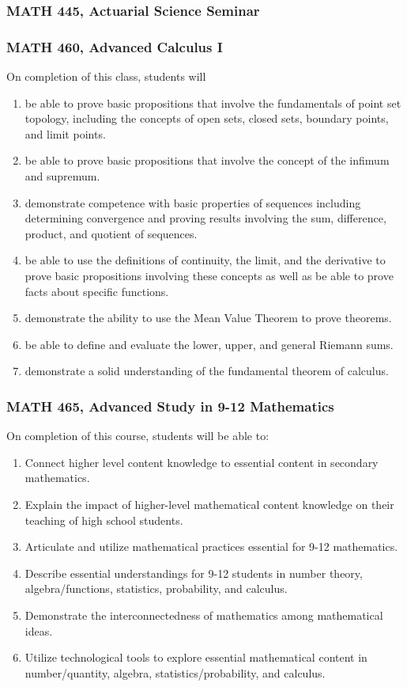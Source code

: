 \documentclass[11pt]{article}
\newenvironment{alphalist}{
\begin{enumerate}[label=(\arabic*),widest=107 ,leftmargin=25pt, itemsep=0pt]}
{\end{enumerate}}
\begin{document}
\subsubsection*{MATH 445, Actuarial Science Seminar}


\subsubsection*{MATH 460, Advanced Calculus I}

On completion of this class, students will
\begin{alphalist}
    \item be able to prove basic propositions that involve the fundamentals of point set topology, including the concepts of open sets, closed sets, boundary points, and limit points.
     \item be able to prove basic propositions that involve the concept of the infimum and supremum. 
    \item demonstrate competence with basic properties of sequences including determining convergence and proving results involving the sum, difference, product, and quotient of sequences.
    \item be able to use the definitions of continuity, the limit, and the derivative to prove basic propositions involving these concepts as well as be able to prove facts about specific functions.
    \item demonstrate the ability to use the Mean Value Theorem to prove theorems. 
    \item be able to define and evaluate the lower, upper, and general Riemann sums.
    \item demonstrate a solid understanding of the fundamental theorem of calculus.
\end{alphalist}

\subsubsection*{MATH 465, Advanced Study in 9-12 Mathematics}

On  completion of this course, students will be able to:
\begin{alphalist}

\item Connect higher level content knowledge to essential content in secondary mathematics.
\item Explain the impact of higher-level mathematical content knowledge on their teaching of high school students.
\item Articulate and utilize mathematical practices essential for 9-12 mathematics.
\item Describe essential understandings for 9-12 students in number theory, algebra/functions, statistics, probability, and calculus.
\item Demonstrate the interconnectedness of mathematics among mathematical ideas.
\item Utilize technological tools to explore essential mathematical content in number/quantity, algebra, statistics/probability, and calculus.
\end{alphalist}
\end{document}
